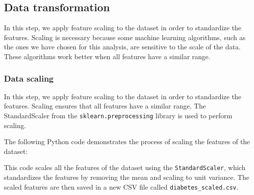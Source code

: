 \subsection{Data transformation}

In this step, we apply feature scaling to the dataset in order to standardize the features. Scaling is necessary because some machine learning algorithms, such as the ones we have chosen for this analysis, are sensitive to the scale of the data. These algorithms work better when all features have a similar range.

\subsubsection{Data scaling}

In this step, we apply feature scaling to the dataset in order to standardize the features. Scaling ensures that all features have a similar range. The StandardScaler from the \texttt{sklearn.preprocessing} library is used to perform scaling.

The following Python code demonstrates the process of scaling the features of the dataset:




This code scales all the features of the dataset using the \texttt{StandardScaler}, which standardizes the features by removing the mean and scaling to unit variance. The scaled features are then saved in a new CSV file called \texttt{diabetes\_scaled.csv}. 
